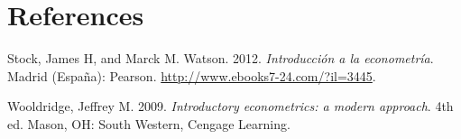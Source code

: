 \documentclass[
  letterpaper,
  DIV=11,
  numbers=noendperiod]{scrreprt}
\newlength{\cslhangindent}
\newenvironment{CSLReferences}[2] %
 {\begin{list}{}{%
  \setlength{\itemindent}{0pt}
  \setlength{\leftmargin}{0pt}
  \setlength{\parsep}{0pt}
  \ifodd #1
   \setlength{\leftmargin}{\cslhangindent}
   \setlength{\itemindent}{-1\cslhangindent}
  \fi
  \setlength{\itemsep}{#2\baselineskip}}}
 {\end{list}}
\begin{document}

\chapter*{References}\label{references}


\label{refs}
\begin{CSLReferences}{1}{0}
Stock, James H, and Marck M. Watson. 2012. \emph{Introducción a la
econometría}. Madrid (España): Pearson.
\url{http://www.ebooks7-24.com/?il=3445}.

Wooldridge, Jeffrey M. 2009. \emph{Introductory econometrics: a modern
approach}. 4th ed. Mason, OH: South Western, Cengage Learning.

\end{CSLReferences}
\end{document}
